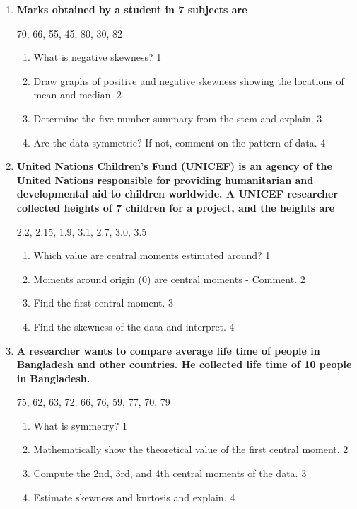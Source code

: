 \documentclass[a4paper,oneside]{book}
\begin{document}
\begin{enumerate}
 \item
	  \textbf{Marks obtained by a student in 7 subjects are} 
	  \begin{center}
	  70, 66, 55, 45, 80, 30, 82
	\end{center}
  
  \begin{enumerate}
    \item
	What is negative skewness? \hfill 1
    \item
	Draw graphs of positive and negative skewness showing the locations of mean and median. \hfill 2
    \item  
	Determine the five number summary from the stem and explain. \hfill 3
    \item
	Are the data symmetric? If not, comment on the pattern of data. \hfill 4
\end{enumerate}

 \item
	  \textbf{United Nations Children's Fund (UNICEF) is an agency of the United Nations responsible for providing humanitarian and developmental aid to children worldwide. A  UNICEF researcher collected heights of 7 children for a project, and the heights are} 

	\begin{center}
	  2.2, 2.15, 1.9, 3.1, 2.7, 3.0, 3.5
	  	\end{center}
  
  \begin{enumerate}
    \item
	Which value are central moments estimated around? \hfill 1
    \item
	Moments around origin (0) are central moments - Comment. \hfill 2
    \item  
	Find the first central moment. \hfill 3
    \item
	Find the skewness of the data and interpret.  \hfill 4
  \end{enumerate}
  
   \item
	  \textbf{A researcher wants to compare average life time of people in Bangladesh and other countries. He collected life time of 10 people in Bangladesh.} 
	  
	  	\begin{center}
	  75, 62, 63, 72, 66, 76, 59, 77, 70, 79
	  	\end{center}
  
  \begin{enumerate}
    \item
	What is symmetry? \hfill 1
    \item
	Mathematically show the theoretical value of the first central moment. \hfill 2
    \item  
	Compute the 2nd, 3rd, and 4th central moments of the data. \hfill 3
    \item
	Estimate skewness and kurtosis and explain. \hfill 4
  \end{enumerate}

\end{enumerate}
\end{document}
